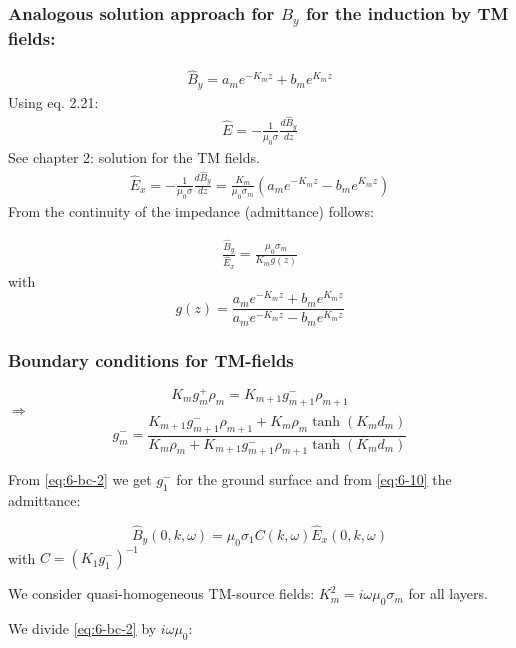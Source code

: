 \newcommand{\Ehat}{\hat{E}}
\newcommand{\Bhat}{\hat{B}}

\subsubsection*{Analogous solution approach for $B_y$ for the induction by TM fields:}
\begin{align*}
\hat{B}_y=a_me^{-K_mz}+b_me^{K_mz}
\end{align*}
Using eq. 2.21:
\begin{align*}
\Ehat=-\frac{1}{\mu_0\sigma}\frac{d\Bhat_y}{dz}
\end{align*}
See chapter 2: solution for the TM fields.
\begin{align*}
\Ehat_x=-\frac{1}{\mu_0\sigma}\frac{d\Bhat_y}{dz}=\frac{K_m}{\mu_0\sigma_m}\left(a_me^{-K_mz}-b_me^{K_mz}\right)
\end{align*}
From the continuity of the impedance (admittance) follows:

\begin{align*}
\frac{\Bhat_y}{\Ehat_x}=\frac{\mu_0\sigma_m}{K_m g(z)}
\end{align*}
with
\begin{equation}
g(z)=\frac{a_me^{-K_mz}+b_me^{K_mz}}{a_me^{-K_mz}-b_me^{K_mz}}
\label{eq:6-10}
\end{equation}
\subsubsection*{Boundary conditions for TM-fields}
\begin{equation}
K_m g_m^+\rho_m=K_{m+1}g_{m+1}^-\rho_{m+1}
\label{eq:6-bc-1}
\end{equation}
$\Rightarrow$
\begin{equation}
g_m^-=\frac{K_{m+1}g_{m+1}^-\rho_{m+1}+K_m\rho_m\tanh(K_md_m)}{K_m\rho_m+K_{m+1}g_{m+1}^-\rho_{m+1}\tanh(K_md_m)}
\label{eq:6-bc-2}
\end{equation}

From \eqref{eq:6-bc-2} we get $g_1^-$ for the ground surface and from \eqref{eq:6-10} the admittance:

\begin{equation*}
\Bhat_y(0,k,\omega)=\mu_0\sigma_1 C(k,\omega)\Ehat_x(0,k,\omega)
\end{equation*}
with $C=(K_1 g_1^-)^{-1}$

We consider quasi-homogeneous TM-source fields: $K_m^2=i\omega\mu_0\sigma_m$ for all layers. 

We divide \eqref{eq:6-bc-2} by $i\omega\mu_0$:

